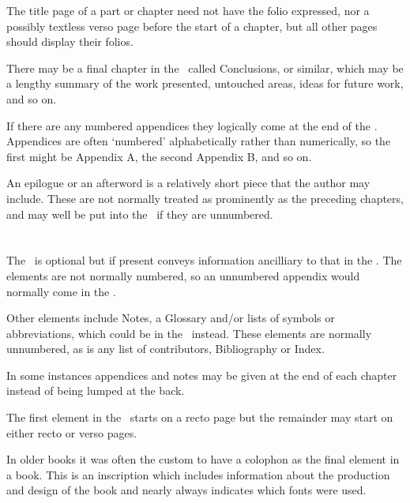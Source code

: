 \documentclass[10pt,a4paper,extrafontsizes]{memoir}
\begin{document}
\begin{paracol}{2}
    The title page of a part
 or chapter need not have the folio expressed, nor
a possibly textless verso page before the start of a chapter, but all other 
pages should display their folios.

    There may be a final chapter in the \pixmainmatter\ called Conclusions, 
or similar, which may be a lengthy summary of the work presented, untouched
areas, ideas for future work, and so on.

    If there are any numbered appendices 
they logically come at the end of
the \pixmainmatter. Appendices are often `numbered' alphabetically rather
than numerically, so the first might be Appendix A, the second Appendix B,
and so on.

    An epilogue or an afterword is a 
relatively short piece that the author may
include. These are not normally treated as prominently as the preceding
chapters, and may well be put into the \pixbackmatter\ if they are 
unnumbered.
\end{paracol}

\section{\prBackmatter}

\begin{paracol}{2}
\switchEng
    The \pixbackmatter\
is optional but if present conveys information ancilliary
to that in the \pixmainmatter. The elements are not normally numbered, so an
unnumbered appendix\index{appendix} would normally come in the \pixbackmatter.

    Other elements include Notes, a Glossary
 and/or lists of symbols or 
abbreviations, which could be in the 
\pixfrontmatter\ instead. These elements 
are normally unnumbered, as is any list of contributors, 
Bibliography\index{bibliography} or Index\index{index}.

    In some instances appendices 
and notes may be given at the end of each
chapter instead of being lumped at the back.

    The first element in the \pixbackmatter\ starts on a recto page but the 
remainder may start on either recto or verso pages.

    In older books it was often the custom to have a colophon
as the final element in a book. This is an inscription which includes 
information about the production and design of the book and nearly 
always indicates which fonts\index{font} were used.
\end{paracol}
\end{document}
